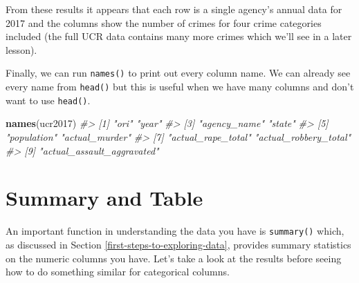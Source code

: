 \documentclass[
  12pt,
]{book}
\newenvironment{Shaded}{\begin{snugshade}}{\end{snugshade}}
\newcommand{\CommentTok}[1]{\textcolor[rgb]{0.56,0.35,0.01}{\textit{#1}}}
\newcommand{\KeywordTok}[1]{\textcolor[rgb]{0.13,0.29,0.53}{\textbf{#1}}}
\newcommand{\NormalTok}[1]{#1}
\begin{document}
From these results it appears that each row is a single agency's annual data for 2017 and the columns show the number of crimes for four crime categories included (the full UCR data contains many more crimes which we'll see in a later lesson).

Finally, we can run \texttt{names()} to print out every column name. We can already see every name from \texttt{head()} but this is useful when we have many columns and don't want to use \texttt{head()}.

\begin{Shaded}
\begin{Highlighting}[]
\KeywordTok{names}\NormalTok{(ucr2017)}
\CommentTok{\#> [1] "ori"                       "year"                     }
\CommentTok{\#> [3] "agency\_name"               "state"                    }
\CommentTok{\#> [5] "population"                "actual\_murder"            }
\CommentTok{\#> [7] "actual\_rape\_total"         "actual\_robbery\_total"     }
\CommentTok{\#> [9] "actual\_assault\_aggravated"}
\end{Highlighting}
\end{Shaded}

\hypertarget{summary-and-table}{%
\section{Summary and Table}\label{summary-and-table}}

An important function in understanding the data you have is \texttt{summary()} which, as discussed in Section \ref{first-steps-to-exploring-data}, provides summary statistics on the numeric columns you have. Let's take a look at the results before seeing how to do something similar for categorical columns.
\end{document}
